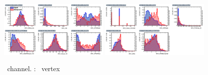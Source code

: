 \begin{figure}[htbp]
	\includegraphics[width=0.48\textwidth]{6_Search/Figures/MVAtechnics/toppairzut/uue/variables_id_c1.png}
	\includegraphics[width=0.48\textwidth]{6_Search/Figures/MVAtechnics/toppairzut/uue/variables_id_c2.png}
	\caption{\emumu\ channel. \TTSR: \Zut\ vertex }
	\label{image:Figuresuuetoppairzut}
\end{figure}



